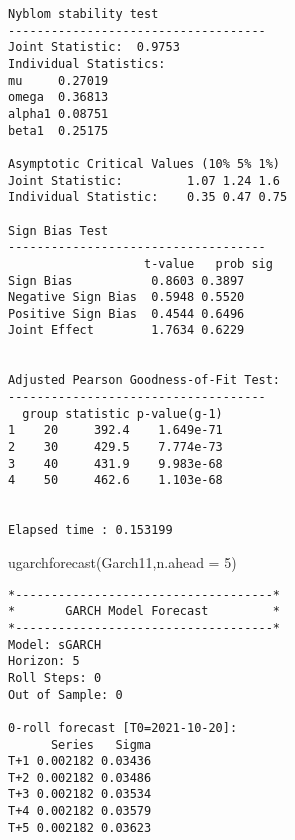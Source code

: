 \documentclass[
  ignorenonframetext,
]{beamer}
\newenvironment{Shaded}{\begin{snugshade}}{\end{snugshade}}
\newcommand{\AttributeTok}[1]{\textcolor[rgb]{0.77,0.63,0.00}{#1}}
\newcommand{\DecValTok}[1]{\textcolor[rgb]{0.00,0.00,0.81}{#1}}
\newcommand{\FunctionTok}[1]{\textcolor[rgb]{0.00,0.00,0.00}{#1}}
\newcommand{\NormalTok}[1]{#1}
\begin{document}
\begin{frame}[fragile]
\begin{verbatim}
Nyblom stability test
------------------------------------
Joint Statistic:  0.9753
Individual Statistics:              
mu     0.27019
omega  0.36813
alpha1 0.08751
beta1  0.25175

Asymptotic Critical Values (10% 5% 1%)
Joint Statistic:         1.07 1.24 1.6
Individual Statistic:    0.35 0.47 0.75

Sign Bias Test
------------------------------------
                   t-value   prob sig
Sign Bias           0.8603 0.3897    
Negative Sign Bias  0.5948 0.5520    
Positive Sign Bias  0.4544 0.6496    
Joint Effect        1.7634 0.6229    


Adjusted Pearson Goodness-of-Fit Test:
------------------------------------
  group statistic p-value(g-1)
1    20     392.4    1.649e-71
2    30     429.5    7.774e-73
3    40     431.9    9.983e-68
4    50     462.6    1.103e-68


Elapsed time : 0.153199 
\end{verbatim}
\end{frame}

\begin{frame}[fragile]
\begin{Shaded}
\begin{Highlighting}[]
\FunctionTok{ugarchforecast}\NormalTok{(Garch11,}\AttributeTok{n.ahead =} \DecValTok{5}\NormalTok{)}
\end{Highlighting}
\end{Shaded}

\begin{verbatim}
*------------------------------------*
*       GARCH Model Forecast         *
*------------------------------------*
Model: sGARCH
Horizon: 5
Roll Steps: 0
Out of Sample: 0

0-roll forecast [T0=2021-10-20]:
      Series   Sigma
T+1 0.002182 0.03436
T+2 0.002182 0.03486
T+3 0.002182 0.03534
T+4 0.002182 0.03579
T+5 0.002182 0.03623
\end{verbatim}
\end{frame}
\end{document}
